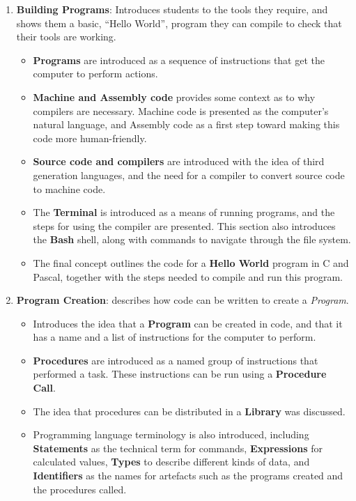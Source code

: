 \begin{enumerate}
  \item \textbf{Building Programs}: Introduces students to the tools they require, and shows them a basic, ``Hello World'', program they can compile to check that their tools are working.
  \begin{itemize}[noitemsep,nolistsep]
    \item \textbf{Programs} are introduced as a sequence of instructions that get the computer to perform actions.
    \item \textbf{Machine and Assembly code} provides some context as to why compilers are necessary. Machine code is presented as the computer's natural language, and Assembly code as a first step toward making this code more human-friendly.
    \item \textbf{Source code and compilers} are introduced with the idea of third generation languages, and the need for a compiler to convert source code to machine code.
    \item The \textbf{Terminal} is introduced as a means of running programs, and the steps for using the compiler are presented. This section also introduces the \textbf{Bash} shell, along with commands to navigate through the file system. 
    \item The final concept outlines the code for a \textbf{Hello World} program in C and Pascal, together with the steps needed to compile and run this program. 
  \end{itemize}
  \item \textbf{Program Creation}: describes how code can be written to create a \emph{Program}.
  \begin{itemize}[noitemsep,nolistsep]
    \item Introduces the idea that a \textbf{Program} can be created in code, and that it has a name and a list of instructions for the computer to perform.
    \item \textbf{Procedures} are introduced as a named group of instructions that performed a task. These instructions can be run using a \textbf{Procedure Call}.
    \item The idea that procedures can be distributed in a \textbf{Library} was discussed.
    \item Programming language terminology is also introduced, including \textbf{Statements} as the technical term for commands, \textbf{Expressions} for calculated values, \textbf{Types} to describe different kinds of data, and \textbf{Identifiers} as the names for artefacts such as the programs created and the procedures called. 

\end{itemize}
\end{enumerate}
